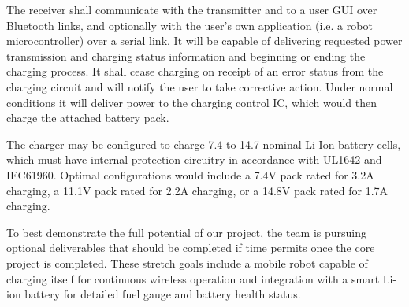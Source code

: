 \documentclass[12pt]{article}
\begin{document}
The receiver shall communicate with the transmitter and to a user GUI over Bluetooth links, and optionally with the user’s own application (i.e. a robot microcontroller) over a serial link. It will be capable of delivering requested power transmission and charging status information and beginning or ending the charging process. It shall cease charging on receipt of an error status from the charging circuit and will notify the user to take corrective action. Under normal conditions it will deliver power to the charging control IC, which would then charge the attached battery pack.\\ \indent

The charger may be configured to charge 7.4 to 14.7 nominal Li-Ion battery cells, which must have internal protection circuitry in accordance with UL1642 and IEC61960. Optimal configurations would include a 7.4V pack rated for 3.2A charging, a 11.1V pack rated for 2.2A charging, or a 14.8V pack rated for 1.7A charging.\\ \indent

To best demonstrate the full potential of our project, the team is pursuing optional deliverables that should be completed if time permits once the core project is completed. These stretch goals include a mobile robot capable of charging itself for continuous wireless operation and integration with a smart Li-ion battery for detailed fuel gauge and battery health status.

\pagebreak

\tableofcontents

\pagebreak

\listoffigures


\listoftables

\pagebreak







\end{document}
